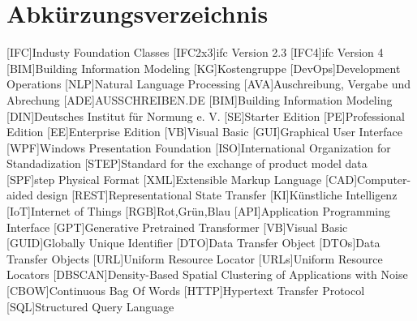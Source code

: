 \chapter{Abkürzungsverzeichnis}
\begin{acronym}
[IFC]{Industy Foundation Classes}
[IFC2x3]{\ac{ifc} Version 2.3}
[IFC4]{\ac{ifc} Version 4}
[BIM]{Building Information Modeling}
[KG]{Kostengruppe}
[DevOps]{Development Operations}
[NLP]{Natural Language Processing}
[AVA]{Auschreibung, Vergabe und Abrechung}
[ADE]{AUSSCHREIBEN.DE}
[BIM]{Building Information Modeling}
[DIN]{Deutsches Institut für Normung e. V.}
[SE]{Starter Edition}
[PE]{Professional Edition}
[EE]{Enterprise Edition}
[VB]{Visual Basic}
[GUI]{Graphical User Interface}
[WPF]{Windows Presentation Foundation}
[ISO]{International Organization for Standadization}
[STEP]{Standard for the exchange of product model data}
[SPF]{\ac{step} Physical Format}
[XML]{Extensible Markup Language}
[CAD]{Computer-aided design}
[REST]{Representational State Transfer}
[KI]{Künstliche Intelligenz}
[IoT]{Internet of Things}
[RGB]{Rot,Grün,Blau}
[API]{Application Programming Interface}
[GPT]{Generative Pretrained Transformer}
[VB]{Visual Basic}
[GUID]{Globally Unique Identifier}
[DTO]{Data Transfer Object}
[DTOs]{Data Transfer Objects}
[URL]{Uniform Resource Locator}
[URLs]{Uniform Resource Locators}
[DBSCAN]{Density-Based Spatial Clustering of Applications with Noise}
[CBOW]{Continuous Bag Of Words}
[HTTP]{Hypertext Transfer Protocol}
[SQL]{Structured Query Language}
\end{acronym}